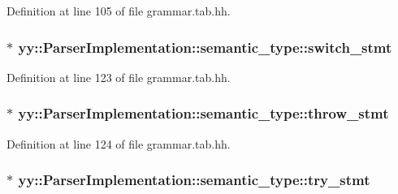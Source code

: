 Definition at line 105 of file grammar.tab.hh.

\hypertarget{unionyy_1_1_parser_implementation_1_1semantic__type_a15069104eea537d91c1587f4ec1fab65}{
\subsubsection[{switch\_\-stmt}]{$\ast$ {\bf yy::ParserImplementation::semantic\_\-type::switch\_\-stmt}}}
\label{unionyy_1_1_parser_implementation_1_1semantic__type_a15069104eea537d91c1587f4ec1fab65}


Definition at line 123 of file grammar.tab.hh.

\hypertarget{unionyy_1_1_parser_implementation_1_1semantic__type_ae5ede8f17f98cc193b47b8f4fded0a94}{
\subsubsection[{throw\_\-stmt}]{$\ast$ {\bf yy::ParserImplementation::semantic\_\-type::throw\_\-stmt}}}
\label{unionyy_1_1_parser_implementation_1_1semantic__type_ae5ede8f17f98cc193b47b8f4fded0a94}


Definition at line 124 of file grammar.tab.hh.

\hypertarget{unionyy_1_1_parser_implementation_1_1semantic__type_a435bd242809bd7b98185daecbd1306ea}{
\subsubsection[{try\_\-stmt}]{$\ast$ {\bf yy::ParserImplementation::semantic\_\-type::try\_\-stmt}}}
\label{unionyy_1_1_parser_implementation_1_1semantic__type_a435bd242809bd7b98185daecbd1306ea}


